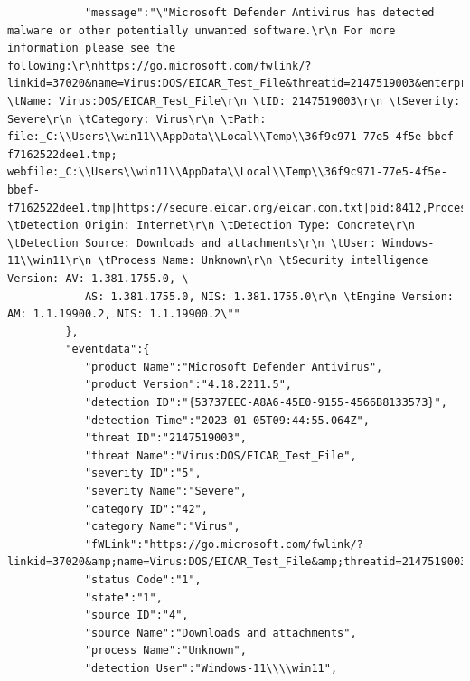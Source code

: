 \begin{itemize}
\begin{verbatim}
            "message":"\"Microsoft Defender Antivirus has detected malware or other potentially unwanted software.\r\n For more information please see the following:\r\nhttps://go.microsoft.com/fwlink/?linkid=37020&name=Virus:DOS/EICAR_Test_File&threatid=2147519003&enterprise=0\r\n \tName: Virus:DOS/EICAR_Test_File\r\n \tID: 2147519003\r\n \tSeverity: Severe\r\n \tCategory: Virus\r\n \tPath: file:_C:\\Users\\win11\\AppData\\Local\\Temp\\36f9c971-77e5-4f5e-bbef-f7162522dee1.tmp; webfile:_C:\\Users\\win11\\AppData\\Local\\Temp\\36f9c971-77e5-4f5e-bbef-f7162522dee1.tmp|https://secure.eicar.org/eicar.com.txt|pid:8412,ProcessStart:133173854939240064\r\n \tDetection Origin: Internet\r\n \tDetection Type: Concrete\r\n \tDetection Source: Downloads and attachments\r\n \tUser: Windows-11\\win11\r\n \tProcess Name: Unknown\r\n \tSecurity intelligence Version: AV: 1.381.1755.0, \
            AS: 1.381.1755.0, NIS: 1.381.1755.0\r\n \tEngine Version: AM: 1.1.19900.2, NIS: 1.1.19900.2\""
         },
         "eventdata":{
            "product Name":"Microsoft Defender Antivirus",
            "product Version":"4.18.2211.5",
            "detection ID":"{53737EEC-A8A6-45E0-9155-4566B8133573}",
            "detection Time":"2023-01-05T09:44:55.064Z",
            "threat ID":"2147519003",
            "threat Name":"Virus:DOS/EICAR_Test_File",
            "severity ID":"5",
            "severity Name":"Severe",
            "category ID":"42",
            "category Name":"Virus",
            "fWLink":"https://go.microsoft.com/fwlink/?linkid=37020&amp;name=Virus:DOS/EICAR_Test_File&amp;threatid=2147519003&amp;enterprise=0",
            "status Code":"1",
            "state":"1",
            "source ID":"4",
            "source Name":"Downloads and attachments",
            "process Name":"Unknown",
            "detection User":"Windows-11\\\\win11",

\end{verbatim}
\end{itemize}
